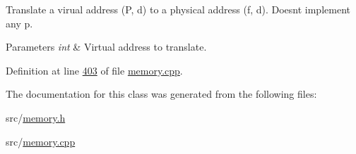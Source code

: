 Translate a virual address (P, d) to a physical address (f, d). Doesn\textquotesingle{}t implement any p. 


\begin{DoxyParams}{Parameters}
{\em int} & Virtual address to translate. \\
\hline
\end{DoxyParams}


Definition at line \hyperlink{memory_8cpp_source_l00403}{403} of file \hyperlink{memory_8cpp_source}{memory.\+cpp}.



The documentation for this class was generated from the following files\+:\begin{DoxyCompactItemize}
\item 
src/\hyperlink{memory_8h}{memory.\+h}\item 
src/\hyperlink{memory_8cpp}{memory.\+cpp}\end{DoxyCompactItemize}
